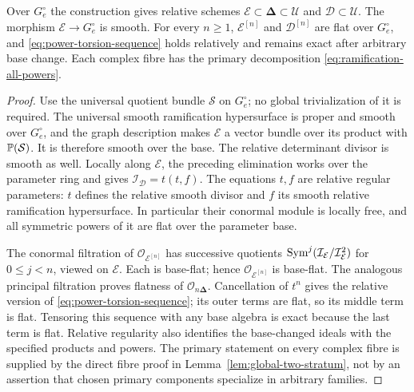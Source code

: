 \begin{proposition}
\label{prop:ramification-flat-family}
Over $G_e^\circ$ the construction gives relative schemes
$\mathcal E\subset\boldsymbol\Delta\subset\mathcal U$ and
$\mathcal D\subset\mathcal U$. The morphism
$\mathcal E\to G_e^\circ$ is smooth. For every $n\ge1$,
$\mathcal E^{[n]}$ and $\mathcal D^{[n]}$ are flat over $G_e^\circ$,
and \eqref{eq:power-torsion-sequence} holds relatively and remains
exact after arbitrary base change. Each complex fibre has the
primary decomposition \eqref{eq:ramification-all-powers}.
\end{proposition}
\begin{proof}
Use the universal quotient bundle $\mathcal S$ on $G_e^\circ$;
no global trivialization of it is required. The universal smooth
ramification hypersurface is proper and smooth over $G_e^\circ$,
and the graph description makes $\mathcal E$ a vector bundle over
its product with $\mathbb P(\mathcal S)$. It is therefore smooth over
the base. The relative determinant divisor is smooth as well.
Locally along $\mathcal E$, the preceding elimination works over
the parameter ring and gives $\mathcal I_{\mathcal D}=t(t,f)$.
The equations $t,f$ are relative regular parameters: $t$ defines
the relative smooth divisor and $f$ its smooth relative
ramification hypersurface. In particular their conormal module
is locally free, and all symmetric powers of it are flat over
the parameter base.

The conormal filtration of $\mathcal O_{\mathcal E^{[n]}}$ has
successive quotients
$\operatorname{Sym}^j(\mathcal I_{\mathcal E}/\mathcal I_{\mathcal E}^2)$
for $0\le j<n$, viewed on $\mathcal E$. Each is base-flat; hence
$\mathcal O_{\mathcal E^{[n]}}$ is base-flat. The analogous
principal filtration proves flatness of
$\mathcal O_{n\boldsymbol\Delta}$. Cancellation of $t^n$ gives
the relative version of \eqref{eq:power-torsion-sequence}; its
outer terms are flat, so its middle term is flat. Tensoring this
sequence with any base algebra is exact because the last term is
flat. Relative regularity also identifies the base-changed ideals
with the specified products and powers. The primary statement
on every complex fibre is supplied by the direct fibre proof in
Lemma~\ref{lem:global-two-stratum}, not by an assertion that chosen
primary components specialize in arbitrary families.
\end{proof}
